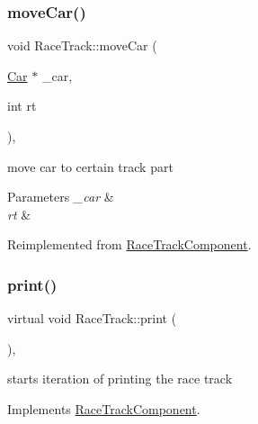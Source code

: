 \mbox{\label{class_race_track_af5549716e03ebf425f0683f0db4bd825}} 
\subsubsection{\texorpdfstring{move\+Car()}{moveCar()}}
{\footnotesize\ttfamily void Race\+Track\+::move\+Car (\begin{DoxyParamCaption}\item[{\mbox{\hyperlink{class_car}{Car}} $\ast$}]{\+\_\+car,  }\item[{int}]{rt }\end{DoxyParamCaption})\hspace{0.3cm}{\ttfamily [inline]}, {\ttfamily [virtual]}}

move car to certain track part 
\begin{DoxyParams}{Parameters}
{\em \+\_\+car} & \\
\hline
{\em rt} & \\
\hline
\end{DoxyParams}


Reimplemented from \mbox{\hyperlink{class_race_track_component_a1925fdddd2cc1541fe649152bacb58ca}{Race\+Track\+Component}}.

\mbox{\label{class_race_track_afc353278ed272b8deb07283c3c45388e}} 
\subsubsection{\texorpdfstring{print()}{print()}}
{\footnotesize\ttfamily virtual void Race\+Track\+::print (\begin{DoxyParamCaption}{ }\end{DoxyParamCaption})\hspace{0.3cm}{\ttfamily [inline]}, {\ttfamily [virtual]}}

starts iteration of printing the race track 

Implements \mbox{\hyperlink{class_race_track_component_a02a8d9520cfd80f31dd94b5fa1e76d47}{Race\+Track\+Component}}.

\mbox{\label{class_race_track_a4b710e5c818fa6ac2c4701cbee3e8cd3}} 
